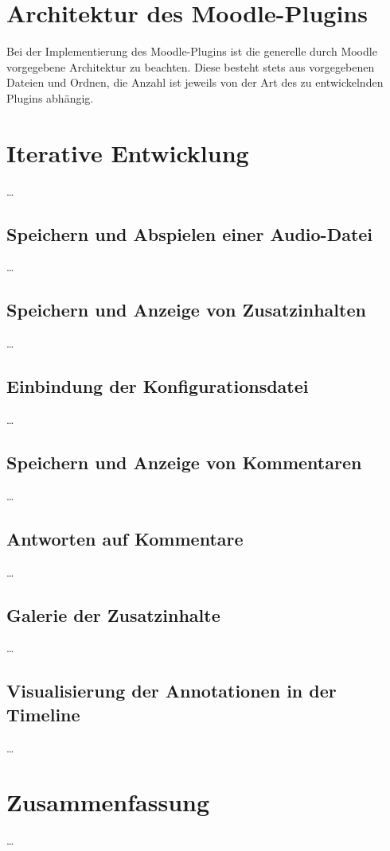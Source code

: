 \section{Architektur des Moodle-Plugins}
Bei der Implementierung des Moodle-Plugins ist die generelle durch Moodle vorgegebene Architektur zu beachten. Diese besteht stets aus vorgegebenen Dateien und Ordnen, die Anzahl ist jeweils von der Art des zu entwickelnden Plugins abhängig.


\section{Iterative Entwicklung}
\dots

\subsection{Speichern und Abspielen einer Audio-Datei}
\dots

\subsection{Speichern und Anzeige von Zusatzinhalten}
\dots

\subsection{Einbindung der Konfigurationsdatei}
\dots

\subsection{Speichern und Anzeige von Kommentaren}
\dots

\subsection{Antworten auf Kommentare}
\dots

\subsection{Galerie der Zusatzinhalte}
\dots

\subsection{Visualisierung der Annotationen in der Timeline}
\dots

\section{Zusammenfassung}
\dots